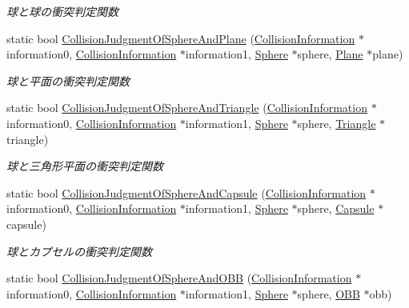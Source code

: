 \begin{DoxyCompactItemize}
\begin{DoxyCompactList}\small\item\em 球と球の衝突判定関数 \end{DoxyCompactList}\item 
static bool \mbox{\hyperlink{class_collision_calculation_a45e86c82ef28085b9c9dde657b4c82fd}{Collision\+Judgment\+Of\+Sphere\+And\+Plane}} (\mbox{\hyperlink{class_collision_information}{Collision\+Information}} $\ast$information0, \mbox{\hyperlink{class_collision_information}{Collision\+Information}} $\ast$information1, \mbox{\hyperlink{class_sphere}{Sphere}} $\ast$sphere, \mbox{\hyperlink{class_plane}{Plane}} $\ast$plane)
\begin{DoxyCompactList}\small\item\em 球と平面の衝突判定関数 \end{DoxyCompactList}\item 
static bool \mbox{\hyperlink{class_collision_calculation_a6e8c8a3900a12e588addb8f9ac7c943a}{Collision\+Judgment\+Of\+Sphere\+And\+Triangle}} (\mbox{\hyperlink{class_collision_information}{Collision\+Information}} $\ast$information0, \mbox{\hyperlink{class_collision_information}{Collision\+Information}} $\ast$information1, \mbox{\hyperlink{class_sphere}{Sphere}} $\ast$sphere, \mbox{\hyperlink{class_triangle}{Triangle}} $\ast$triangle)
\begin{DoxyCompactList}\small\item\em 球と三角形平面の衝突判定関数 \end{DoxyCompactList}\item 
static bool \mbox{\hyperlink{class_collision_calculation_abaa91100b66f334195c02efe9d847ab1}{Collision\+Judgment\+Of\+Sphere\+And\+Capsule}} (\mbox{\hyperlink{class_collision_information}{Collision\+Information}} $\ast$information0, \mbox{\hyperlink{class_collision_information}{Collision\+Information}} $\ast$information1, \mbox{\hyperlink{class_sphere}{Sphere}} $\ast$sphere, \mbox{\hyperlink{class_capsule}{Capsule}} $\ast$capsule)
\begin{DoxyCompactList}\small\item\em 球とカプセルの衝突判定関数 \end{DoxyCompactList}\item 
static bool \mbox{\hyperlink{class_collision_calculation_ab7c71c5e225a533630de4172b558c151}{Collision\+Judgment\+Of\+Sphere\+And\+O\+BB}} (\mbox{\hyperlink{class_collision_information}{Collision\+Information}} $\ast$information0, \mbox{\hyperlink{class_collision_information}{Collision\+Information}} $\ast$information1, \mbox{\hyperlink{class_sphere}{Sphere}} $\ast$sphere, \mbox{\hyperlink{class_o_b_b}{O\+BB}} $\ast$obb)

\end{DoxyCompactItemize}
